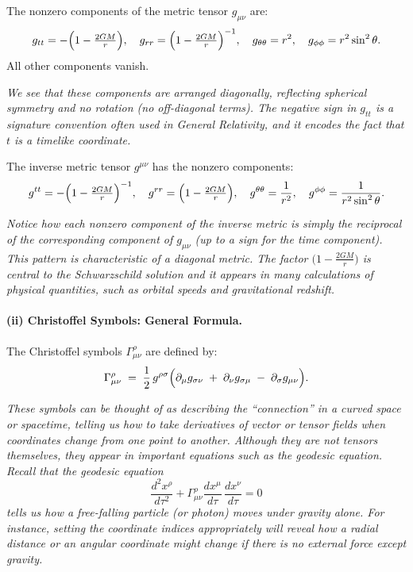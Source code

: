 \noindent
The nonzero components of the metric tensor \(g_{\mu\nu}\) are:
\[
g_{tt} = -\Bigl(1 - \tfrac{2GM}{r}\Bigr), 
\quad
g_{rr} = \Bigl(1 - \tfrac{2GM}{r}\Bigr)^{-1},
\quad
g_{\theta\theta} = r^2,
\quad
g_{\phi\phi} = r^2 \sin^2\theta.
\]
All other components vanish.

\emph{We see that these components are arranged diagonally, reflecting spherical symmetry and no rotation (no off-diagonal terms). The negative sign in \(g_{tt}\) is a signature convention often used in General Relativity, and it encodes the fact that \(t\) is a timelike coordinate.}

\smallskip

\noindent
The inverse metric tensor \(g^{\mu\nu}\) has the nonzero components:
\[
g^{tt} 
= 
-\Bigl(1 - \tfrac{2GM}{r}\Bigr)^{-1},
\quad
g^{rr} 
= 
\Bigl(1 - \tfrac{2GM}{r}\Bigr),
\quad
g^{\theta\theta} 
= 
\frac{1}{r^2},
\quad
g^{\phi\phi} 
= 
\frac{1}{r^2 \sin^2\theta}.
\]

\emph{Notice how each nonzero component of the inverse metric is simply the reciprocal of the corresponding component of \(g_{\mu\nu}\) (up to a sign for the time component). This pattern is characteristic of a diagonal metric. The factor \(\bigl(1 - \frac{2GM}{r}\bigr)\) is central to the Schwarzschild solution and it appears in many calculations of physical quantities, such as orbital speeds and gravitational redshift.}

\paragraph{(ii) Christoffel Symbols: General Formula.}
The Christoffel symbols \(\Gamma^\rho_{\mu\nu}\) are defined by:
\[
\Gamma^\rho_{\mu \nu} 
\;=\;
\frac{1}{2} \, g^{\rho \sigma}
\Bigl(
\partial_\mu g_{\sigma\nu}
\;+\;
\partial_\nu g_{\sigma\mu}
\;-\;
\partial_\sigma g_{\mu\nu}
\Bigr).
\]

\emph{These symbols can be thought of as describing the ``connection'' in a curved space or spacetime, telling us how to take derivatives of vector or tensor fields when coordinates change from one point to another. Although they are not tensors themselves, they appear in important equations such as the geodesic equation. Recall that the geodesic equation}
\[
\frac{d^2 x^\rho}{d\tau^2} 
+ 
\Gamma^\rho_{\mu\nu} 
\frac{dx^\mu}{d\tau}\,\frac{dx^\nu}{d\tau} 
= 0
\]
\emph{tells us how a free-falling particle (or photon) moves under gravity alone. For instance, setting the coordinate indices appropriately will reveal how a radial distance or an angular coordinate might change if there is no external force except gravity.}

